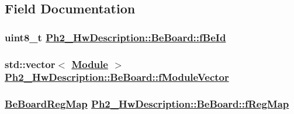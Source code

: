 \subsection{Field Documentation}
\hypertarget{class_ph2___hw_description_1_1_be_board_abe1a515a23ff8813d4641293a8b4ba1}{
\subsubsection[fBeId]{\setlength{\rightskip}{0pt plus 5cm}uint8\_\-t \hyperlink{class_ph2___hw_description_1_1_be_board_abe1a515a23ff8813d4641293a8b4ba1}{Ph2\_\-Hw\-Description::Be\-Board::f\-Be\-Id}}}
\label{class_ph2___hw_description_1_1_be_board_abe1a515a23ff8813d4641293a8b4ba1}


\hypertarget{class_ph2___hw_description_1_1_be_board_dcee78870a20c92fc8c060ff709a4baf}{
\subsubsection[fModuleVector]{\setlength{\rightskip}{0pt plus 5cm}std::vector$<$ \hyperlink{class_ph2___hw_description_1_1_module}{Module} $>$ \hyperlink{class_ph2___hw_description_1_1_be_board_dcee78870a20c92fc8c060ff709a4baf}{Ph2\_\-Hw\-Description::Be\-Board::f\-Module\-Vector}}}
\label{class_ph2___hw_description_1_1_be_board_dcee78870a20c92fc8c060ff709a4baf}


\hypertarget{class_ph2___hw_description_1_1_be_board_6db4850485715c0f23c97c3d621a781b}{
\subsubsection[fRegMap]{\setlength{\rightskip}{0pt plus 5cm}\hyperlink{namespace_ph2___hw_description_2e13fb82c8ed98154c60f9d0f8467d72}{Be\-Board\-Reg\-Map} \hyperlink{class_ph2___hw_description_1_1_be_board_6db4850485715c0f23c97c3d621a781b}{Ph2\_\-Hw\-Description::Be\-Board::f\-Reg\-Map}}}
\label{class_ph2___hw_description_1_1_be_board_6db4850485715c0f23c97c3d621a781b}


